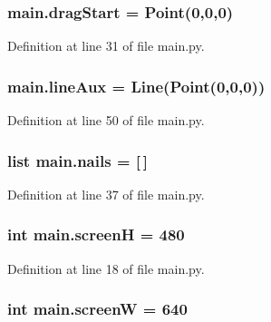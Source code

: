 \subsubsection[{\texorpdfstring{drag\+Start}{dragStart}}]{\setlength{\rightskip}{0pt plus 5cm}main.\+drag\+Start = {\bf Point}(0,0,0)}\hypertarget{namespacemain_a76ff6cc371da95e41b8b785e77bf79aa}{}\label{namespacemain_a76ff6cc371da95e41b8b785e77bf79aa}


Definition at line 31 of file main.\+py.

\subsubsection[{\texorpdfstring{line\+Aux}{lineAux}}]{\setlength{\rightskip}{0pt plus 5cm}main.\+line\+Aux = {\bf Line}({\bf Point}(0,0,0))}\hypertarget{namespacemain_a8dd8e1c4bcedfacfff187452b92655c6}{}\label{namespacemain_a8dd8e1c4bcedfacfff187452b92655c6}


Definition at line 50 of file main.\+py.

\subsubsection[{\texorpdfstring{nails}{nails}}]{\setlength{\rightskip}{0pt plus 5cm}list main.\+nails = \mbox{[}$\,$\mbox{]}}\hypertarget{namespacemain_a184193594cc4348fd4f60c39b6a01fcc}{}\label{namespacemain_a184193594cc4348fd4f60c39b6a01fcc}


Definition at line 37 of file main.\+py.

\subsubsection[{\texorpdfstring{screenH}{screenH}}]{\setlength{\rightskip}{0pt plus 5cm}int main.\+screenH = 480}\hypertarget{namespacemain_ad8989b28561b60a2f903db7303bd7d2f}{}\label{namespacemain_ad8989b28561b60a2f903db7303bd7d2f}


Definition at line 18 of file main.\+py.

\subsubsection[{\texorpdfstring{screenW}{screenW}}]{\setlength{\rightskip}{0pt plus 5cm}int main.\+screenW = 640}\hypertarget{namespacemain_a985da8a132d11dcc00d693b5c6a62066}{}\label{namespacemain_a985da8a132d11dcc00d693b5c6a62066}


